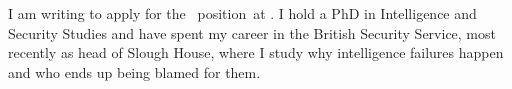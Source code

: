 
I am writing to apply for the \theposition\ position\maybedept\maybeschool\ at \theemployer\maybejobref. I hold a PhD in Intelligence and Security Studies and have spent my career in the British Security Service, most recently as head of Slough House, where I study why intelligence failures happen and who ends up being blamed for them.\maybeappsentence
